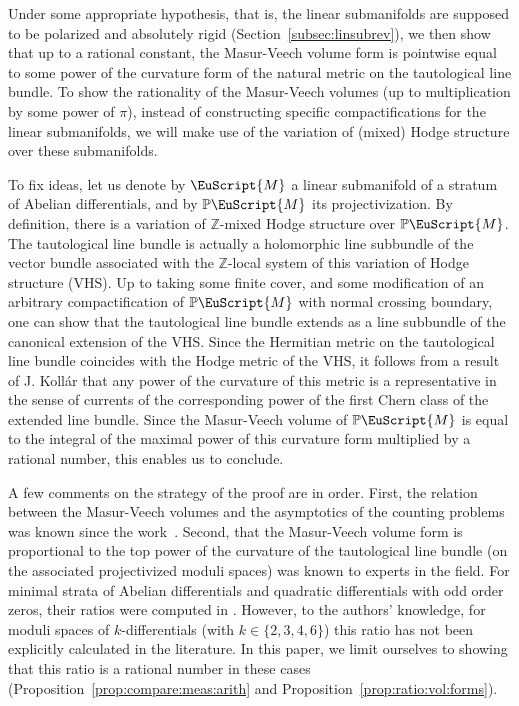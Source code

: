 \documentclass[JEP,XML,SOM,Unicode]{cedram}
\let\mathcal\EuScript
\theoremstyle{plain}
\theoremstyle{definition}
\newcommand\Z{\mathbb{Z}}
\newcommand{\Pb}{\mathbb{P}}
\newcommand{\cM}{\mathcal{M}}
\begin{document}
Under some appropriate hypothesis, that is, the linear submanifolds are supposed to be polarized and absolutely rigid (\cf Section~\ref{subsec:linsubrev}), we then show that up to a rational constant, the Masur-Veech volume form is pointwise equal to some power of the curvature form of the natural metric on the tautological line bundle.
To show the rationality of the Masur-Veech volumes (up to multiplication by some power of $\pi$), instead of constructing specific compactifications for the linear submanifolds, we will make use of the variation of (mixed) Hodge structure over these submanifolds.

To fix ideas, let us denote by $\cM$ a linear submanifold of a stratum of Abelian differentials, and by $\Pb\cM$ its projectivization.
By definition, there is a variation of $\Z$-mixed Hodge structure over $\Pb\cM$.
The tautological line bundle is actually a holomorphic line subbundle of the vector bundle associated with the $\Z$-local system of this variation of Hodge structure (VHS).
Up to taking some finite cover, and some modification of an arbitrary compactification of $\Pb\cM$ with normal crossing boundary, one can show that the tautological line bundle extends as a line subbundle of the canonical extension of the VHS.
Since the Hermitian metric on the tautological line bundle coincides with the Hodge metric of the VHS, it follows from a result of J. Kollár \cite{Kollar87} that any power of the curvature of this metric is a representative in the sense of currents of the corresponding power of the first Chern class of the extended line bundle. Since the Masur-Veech volume of $\Pb\cM$ is equal to the integral of the maximal power of this curvature form multiplied by a rational number, this enables us to conclude.

A few comments on the strategy of the proof are in order. First, the relation between the Masur-Veech volumes and the asymptotics of the counting problems was known since the work~\cite{EO01}. Second, that the Masur-Veech volume form is proportional to the top power of the curvature of the tautological line bundle (on the associated projectivized moduli spaces) was known to experts in the field.
For minimal strata of Abelian differentials and quadratic differentials with odd order zeros, their ratios were computed in \cite{Sau18, CMS19}.
However, to the authors' knowledge, for moduli spaces of $k$-differentials (with $k\in \{2,3,4,6\}$) this ratio has not been explicitly calculated in the literature.
In this paper, we limit ourselves to showing that this ratio is a rational number in these cases (\cf Proposition~\ref{prop:compare:meas:arith} and Proposition~\ref{prop:ratio:vol:forms}).
\end{document}
